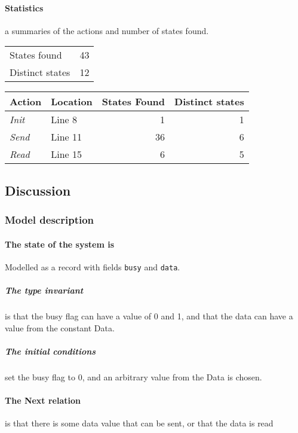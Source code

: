\documentclass[12pt]{article}
\begin{document}
\paragraph{Statistics} a summaries of the actions and number of states
found.

\begin{table}[h]
\begin{tabular}{lr}
	States found & \num{43} \\
 Distinct states & \num{12} \\ 
\end{tabular}
\end{table}

\begin{table}[h]
\begin{tabular}{llrr}
	\textbf{Action} & Location & States Found & \textbf{Distinct states} \\
	\hline
	\textit{Init}   & Line 8 & 1 & 1 \\
	\textit{Send}   & Line 11 & 36 & 6 \\
	\textit{Read}   & Line 15 & 6 & 5 \\
\end{tabular}
\end{table}

\subsection{Discussion}
\subsubsection{Model description} 
\paragraph{The state of the system is } Modelled as a record with fields
\texttt{busy} and \texttt{data}. 

\subparagraph{The type invariant} is that the busy flag can have a value of 0
and 1, and that the data can have a value from the constant Data.

\subparagraph{The initial conditions} 
set the busy flag to 0, and an arbitrary value from the Data is chosen.

\paragraph{The Next relation} is that there is some data value that can be
sent, or that the data is read
\end{document}
